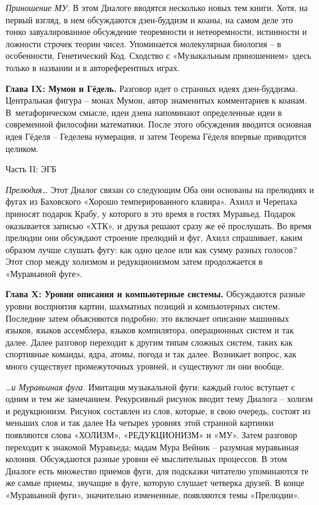 \documentclass[../main.tex]{subfiles}
\begin{document}
\emph{Приношение МУ.}
В этом Диалоге вводятся несколько новых тем книги. Хотя, на первый взгляд, в нем обсуждаются дзен-буддизм и коаны, на самом деле это тонко завуалированное обсуждение теоремности и нетеоремности, истинности и ложности строчек теории чисел. Упоминается молекулярная биология \--- в особенности, Генетический Код. Сходство с «Музыкальным приношением» здесь только в названии и в автореферентных играх.

\textbf{Глава IX: Мумон и Гёдель.}
Разговор идет о странных идеях дзен-буддизма. Центральная фигура \--- монах Мумон, автор знаменитых комментариев к коанам. В~метафорическом смысле, идеи дзена напоминают определенные идеи в современной философии математики. После этого обсуждения вводится основная идея Гёделя \--- Геделева нумерация, и затем Теорема Гёделя впервые приводится целиком.


\begin{center}
    \Large
    Часть II: ЭГБ
\end{center}

\emph{Прелюдия\ldots}
Этот Диалог связан со следующим Оба они основаны на прелюдиях и фугах из Баховского «Хорошо темперированного клавира». Ахилл и Черепаха приносят подарок Крабу, у которого в это время в гостях Муравьед. Подарок оказывается записью «ХТК», и друзья решают сразу же её прослушать. Во время прелюдии они обсуждают строение прелюдий и фуг, Ахилл спрашивает, каким образом лучше слушать фугу: как одно целое или как сумму разных голосов? Этот спор между холизмом и редукционизмом затем продолжается в «Муравьиной фуге».

\textbf{Глава X: Уровни описания и компьютерные системы.}
Обсуждаются разные уровни восприятия картин, шахматных позиций и компьютерных систем. Последние затем объясняются подробно; это включает описание машинных языков, языков ассемблера, языков компилятора, операционных систем и так далее. Далее разговор переходит к другим типам сложных систем, таких как спортивные команды, ядра, атомы, погода и так далее. Возникает вопрос, как много существует промежуточных уровней, и существуют ли они вообще.

\emph{\ldots и Муравьиная фуга.}
Имитация музыкальной фуги: каждый голос вступает с одним и тем же замечанием. Рекурсивный рисунок вводит тему Диалога \--- холизм и редукционизм. Рисунок составлен из слов, которые, в свою очередь, состоят из меньших слов и так далее На четырех уровнях этой странной картинки появляются слова «ХОЛИЗМ», «РЕДУКЦИОНИЗМ» и «МУ». Затем разговор переходит к знакомой Муравьеда; мадам Мура Вейник \--- разумная муравьиная колония. Обсуждаются разные уровни её мыслительных процессов. В этом Диалоге есть множество приемов фуги, для подсказки читателю упоминаются те же самые приемы, звучащие в фуге, которую слушает четверка друзей. В конце «Муравьиной фуги», значительно измененные, появляются темы «Прелюдии».
\end{document}
